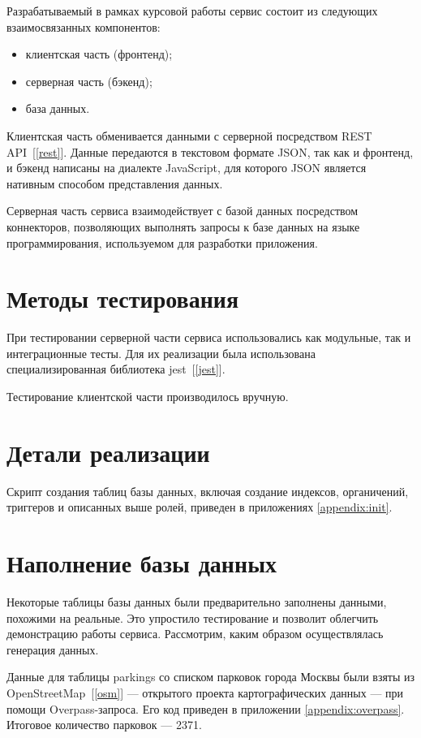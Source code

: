 Разрабатываемый в рамках курсовой работы сервис состоит из следующих взаимосвязанных компонентов:

\begin{itemize}
    \item клиентская часть (фронтенд);
    \item серверная часть (бэкенд);
    \item база данных.
\end{itemize}

Клиентская часть обменивается данными с серверной посредством REST API~[\ref{rest}]. Данные передаются в текстовом формате JSON, так как и фронтенд, и бэкенд написаны на диалекте JavaScript, для которого JSON является нативным способом представления данных.

Серверная часть сервиса взаимодействует с базой данных посредством коннекторов, позволяющих выполнять запросы к базе данных на языке программирования, используемом для разработки приложения.

\section{Методы тестирования}

При тестировании серверной части сервиса использовались как модульные, так и интеграционные тесты. Для их реализации была использована специализированная библиотека jest~[\ref{jest}].

Тестирование клиентской части производилось вручную.

\section{Детали реализации}

Скрипт создания таблиц базы данных, включая создание индексов, органичений, триггеров и описанных выше ролей, приведен в приложениях \ref{appendix:init}.

\section{Наполнение базы данных}

Некоторые таблицы базы данных были предварительно заполнены данными, похожими на реальные. Это упростило тестирование и позволит облегчить демонстрацию работы сервиса. Рассмотрим, каким образом осуществлялась генерация данных.

Данные для таблицы parkings со списком парковок города Москвы были взяты из OpenStreetMap~[\ref{osm}] --- открытого проекта картографических данных --- при помощи Overpass-запроса. Его код приведен в приложении \ref{appendix:overpass}. Итоговое количество парковок --- 2371.

